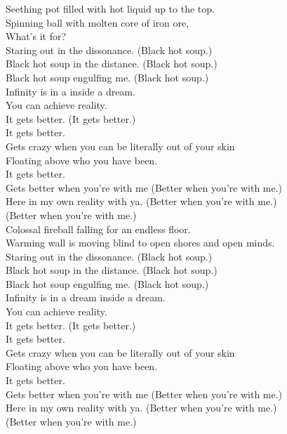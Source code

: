 Seething pot filled with hot liquid up to the top. \\
Spinning ball with molten core of iron ore, \\
What's it for? \\

Staring out in the dissonance. (Black hot soup.) \\
Black hot soup in the distance. (Black hot soup.) \\
Black hot soup engulfing me. (Black hot soup.) \\

Infinity is in a  inside a dream. \\
You can achieve reality. \\
It gets better. (It gets better.) \\
It gets better. \\
Gets crazy when you can be literally out of your skin \\
Floating above who you have been. \\
It gets better. \\
Gets better when you're with me (Better when you're with me.) \\
Here in my own reality with ya. (Better when you're with me.)\\
(Better when you're with me.) \\

Colossal fireball falling for an endless floor. \\
Warming wall is moving blind to open shores and open minds. \\

Staring out in the dissonance. (Black hot soup.) \\
Black hot soup in the distance. (Black hot soup.) \\
Black hot soup engulfing me. (Black hot soup.) \\

Infinity is in a dream inside a dream. \\
You can achieve reality. \\
It gets better. (It gets better.) \\
It gets better. \\
Gets crazy when you can be literally out of your skin \\
Floating above who you have been. \\
It gets better. \\
Gets better when you're with me (Better when you're with me.) \\
Here in my own reality with ya. (Better when you're with me.)\\
(Better when you're with me.) \\

